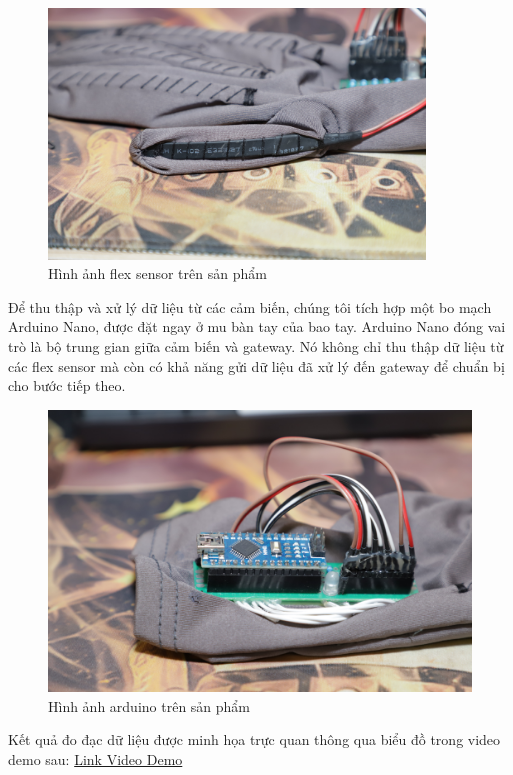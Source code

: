 \begin{figure}[H]
    \centering
    \includegraphics[width=10cm]{Images/Experimental results/flex_sensor.JPG}
\caption{Hình ảnh flex sensor trên sản phẩm}
\end{figure}

\indent Để thu thập và xử lý dữ liệu từ các cảm biến, chúng tôi tích hợp một bo mạch Arduino Nano, được đặt ngay ở mu bàn tay của bao tay. Arduino Nano đóng vai trò là bộ trung gian giữa cảm biến và gateway. Nó không chỉ thu thập dữ liệu từ các flex sensor mà còn có khả năng gửi dữ liệu đã xử lý đến gateway để chuẩn bị cho bước tiếp theo.

\begin{figure}[H]
    \centering
    \includegraphics[width=13cm]{Images/Experimental results/arduino.JPG}
\caption{Hình ảnh arduino trên sản phẩm}
\end{figure}

\indent Kết quả đo đạc dữ liệu được minh họa trực quan thông qua biểu đồ trong video demo sau: \href{https://drive.google.com/file/d/15w1vhGEa1Rosjk0dPk62oQYnOiVk-edL/view?usp=drive_link}{Link Video Demo}

